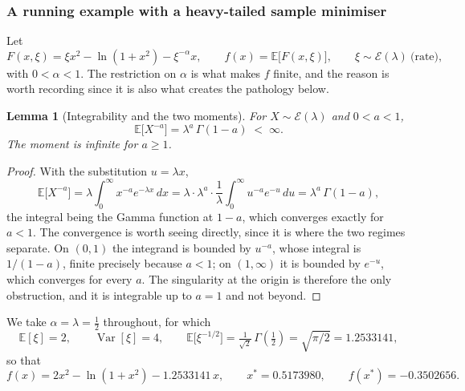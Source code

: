\documentclass[11pt]{article}
\theoremstyle{plain}
\newtheorem{lemma}[theorem]{Lemma}
\theoremstyle{definition}
\theoremstyle{remark}
\numberwithin{equation}{section}
\providecommand{\E}{\mathbb{E}}
\providecommand{\Var}{\operatorname{Var}}
\begin{document}
\subsubsection{A running example with a heavy-tailed sample minimiser}

Let
\begin{equation}
  F(x,\xi) = \xi x^2 - \ln(1+x^2) - \xi^{-\alpha} x ,
  \qquad
  f(x) = \E\bigl[F(x,\xi)\bigr] ,
  \qquad \xi \sim \mathcal{E}(\lambda) \ \text{(rate)} ,
  \label{eqn: stoch example}
\end{equation}
with $0 < \alpha < 1$. The restriction on $\alpha$ is what makes $f$ finite, and the reason is
worth recording since it is also what creates the pathology below.

\begin{lemma}[Integrability and the two moments]
\label{lem: gamma moment}
  For $X \sim \mathcal{E}(\lambda)$ and $0 < a < 1$,
  \begin{equation}
    \E\bigl[X^{-a}\bigr] = \lambda^{a}\,\Gamma(1-a) \;<\; \infty .
    \label{eqn: gamma moment}
  \end{equation}
  The moment is infinite for $a \geq 1$.
\end{lemma}

\begin{proof}
  With the substitution $u = \lambda x$,
  \begin{equation*}
    \E\bigl[X^{-a}\bigr]
      = \lambda\int_0^\infty x^{-a} e^{-\lambda x}\,dx
      = \lambda \cdot \lambda^{a} \cdot \frac{1}{\lambda}
        \int_0^\infty u^{-a} e^{-u}\,du
      = \lambda^{a}\,\Gamma(1-a) ,
  \end{equation*}
  the integral being the Gamma function at $1-a$, which converges exactly for $a < 1$. The
  convergence is worth seeing directly, since it is where the two regimes separate. On $(0,1)$
  the integrand is bounded by $u^{-a}$, whose integral is $1/(1-a)$, finite precisely because
  $a < 1$; on $(1,\infty)$ it is bounded by $e^{-u}$, which converges for every $a$. The
  singularity at the origin is therefore the only obstruction, and it is integrable up to
  $a = 1$ and not beyond.
\end{proof}

We take $\alpha = \lambda = \tfrac12$ throughout, for which
\begin{equation}
  \E[\xi] = 2 ,
  \qquad
  \Var[\xi] = 4 ,
  \qquad
  \E\bigl[\xi^{-1/2}\bigr] = \tfrac{1}{\sqrt2}\,\Gamma(\tfrac12) = \sqrt{\pi/2} = 1.2533141 ,
  \label{eqn: stoch constants}
\end{equation}
so that
\begin{equation}
  f(x) = 2x^2 - \ln(1+x^2) - 1.2533141\,x ,
  \qquad
  x^* = 0.5173980 ,
  \qquad
  f(x^*) = -0.3502656 .
  \label{eqn: stoch f}
\end{equation}
\end{document}
